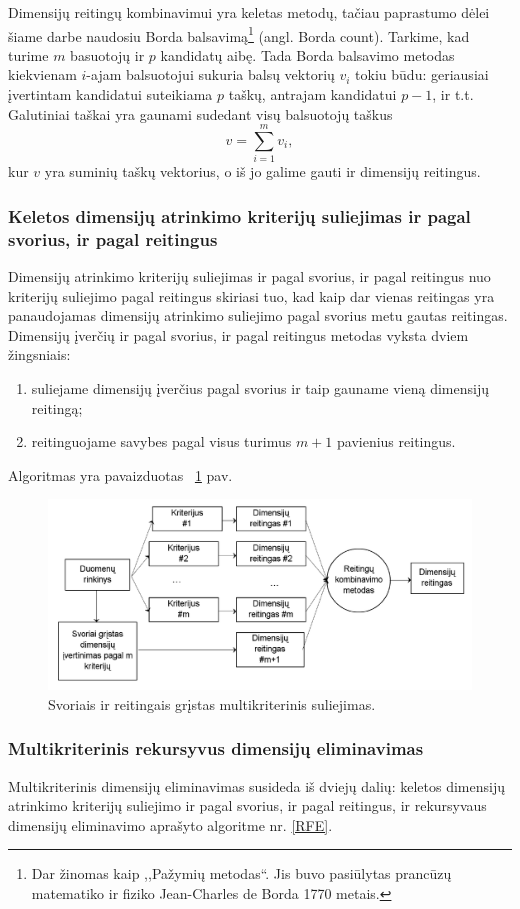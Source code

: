 Dimensijų reitingų kombinavimui yra keletas metodų\cite{dwork2001rank}, tačiau
paprastumo dėlei šiame darbe naudosiu Borda balsavimą\footnote{Dar žinomas kaip
,,Pažymių metodas``. Jis buvo pasiūlytas prancūzų matematiko ir fiziko 
Jean-Charles de Borda 1770 metais.} (angl. Borda count). Tarkime, kad turime
$m$ basuotojų ir $p$ kandidatų aibę. Tada Borda balsavimo metodas kiekvienam
$i$-ajam balsuotojui sukuria balsų vektorių $v_i$ tokiu būdu: geriausiai 
įvertintam kandidatui suteikiama $p$ taškų, antrajam kandidatui $p-1$, ir t.t.
Galutiniai taškai yra gaunami sudedant visų balsuotojų taškus
\begin{equation}
 v = \sum_{i=1}^m v_i,
\end{equation}
kur $v$ yra suminių taškų vektorius, o iš jo galime gauti ir dimensijų reitingus.

\subsubsection{Keletos dimensijų atrinkimo kriterijų suliejimas ir pagal 
svorius, ir pagal reitingus}

Dimensijų atrinkimo kriterijų suliejimas ir pagal svorius, ir pagal reitingus
nuo kriterijų suliejimo pagal reitingus skiriasi tuo, kad kaip dar vienas 
reitingas yra panaudojamas dimensijų atrinkimo suliejimo pagal svorius metu
gautas reitingas.
Dimensijų įverčių ir pagal svorius, ir pagal reitingus metodas vyksta dviem
žingsniais:
\begin{enumerate}
  \item suliejame dimensijų įverčius  pagal svorius ir taip gauname vieną 
  dimensijų reitingą;
  \item reitinguojame savybes pagal visus turimus $m+1$ pavienius reitingus.
\end{enumerate} 
Algoritmas yra pavaizduotas ~\ref{fig:figure3} pav.
\begin{figure}
 \centering
 \includegraphics[width=1\textwidth]{images/score_and_ranking_based_multicriterion_fusion_4.png}
 \caption{Svoriais ir reitingais grįstas multikriterinis suliejimas.}
 \label{fig:figure3}
\end{figure}

\subsubsection{Multikriterinis rekursyvus dimensijų eliminavimas}

Multikriterinis dimensijų eliminavimas\cite{yang2011robust} susideda iš dviejų
dalių: keletos dimensijų atrinkimo kriterijų suliejimo ir pagal svorius, ir 
pagal reitingus, ir rekursyvaus dimensijų eliminavimo aprašyto algoritme 
nr. \ref{RFE}.
